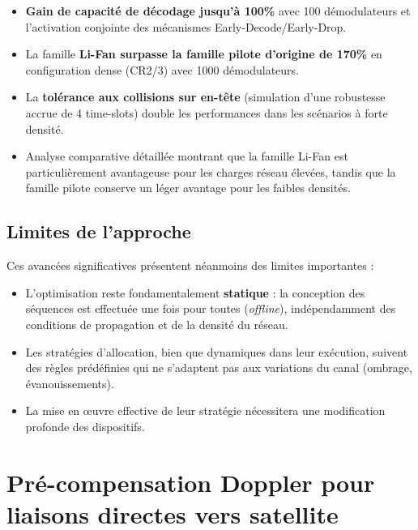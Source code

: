 \begin{itemize}
	\item \textbf{Gain de capacité de décodage jusqu'à 100\%} avec 100 démodulateurs et l'activation conjointe des mécanismes Early-Decode/Early-Drop.
	\item La famille \textbf{Li-Fan surpasse la famille pilote d'origine de 170\%} en configuration dense (CR2/3) avec 1000 démodulateurs.
	\item La \textbf{tolérance aux collisions sur en-tête} (simulation d'une robustesse accrue de 4 time-slots) double les performances dans les scénarios à forte densité.
	\item Analyse comparative détaillée montrant que la famille Li-Fan est particulièrement avantageuse pour les charges réseau élevées, tandis que la famille pilote conserve un léger avantage pour les faibles densités.
\end{itemize}

\subsection{Limites de l'approche}

Ces avancées significatives présentent néanmoins des limites importantes :

\begin{itemize}
	\item L'optimisation reste fondamentalement \textbf{statique} : la conception des séquences est effectuée une fois pour toutes (\textit{offline}), indépendamment des conditions de propagation et de la densité du réseau.
	\item Les stratégies d'allocation, bien que dynamiques dans leur exécution, suivent des règles prédéfinies qui ne s'adaptent pas aux variations du canal (ombrage, évanouissements).
	\item La mise en œuvre effective de leur stratégie nécessitera une modification profonde des dispositifs. 
\end{itemize}

\section{Pré-compensation Doppler pour liaisons directes vers satellite}

